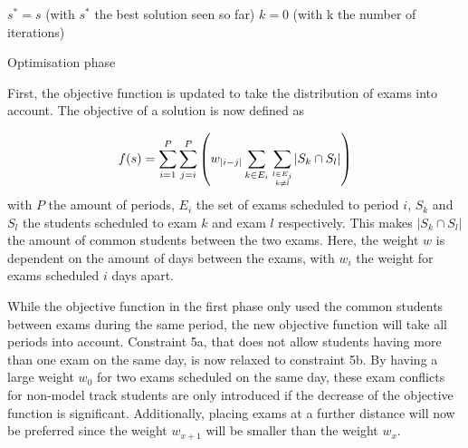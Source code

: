 \begin{algorithm}
 $s^* = s$ (with $s^*$ the best solution seen so far)\;
 $k = 0$ (with k the number of iterations)\;

\caption{Optimisation phase}
\label{alg:phase2}
\end{algorithm}


First, the objective function is updated to take the distribution of exams into account. The objective of a solution is now defined as

\begin{equation}
    f(s) = \sum_{i=1}^{P} \sum_{j=i}^{P}\left(w_{|i-j|} \sum_{k \in E_i}^{}\sum_{l \in E_j \atop k \neq l}^{} \lvert S_k \cap S_l \rvert\right)
\end{equation}
with $P$ the amount of periods, $E_i$ the set of exams scheduled to period $i$, $S_k$ and $S_l$ the students scheduled to exam $k$ and exam $l$ respectively. This makes $\lvert S_k \cap S_l \rvert$ the amount of common students between the two exams. Here, the weight $w$ is dependent on the amount of days between the exams, with $w_i$ the weight for exams scheduled $i$ days apart.

While the objective function in the first phase only used the common students between exams during the same period, the new objective function will take all periods into account. Constraint 5a, that does not allow students having more than one exam on the same day, is now relaxed to constraint 5b. By having a large weight $w_0$ for two exams scheduled on the same day, these exam conflicts for non-model track students are only introduced if the decrease of the objective function is significant. Additionally, placing exams at a further distance will now be preferred since the weight $w_{x+1}$ will be smaller than the weight $w_x$.


